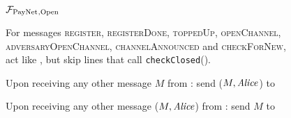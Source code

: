 \begin{figure}[!htbp]
  \begin{systembox}{$\mathcal{F}_{\mathrm{PayNet}}{}_{\mathrm{, Open}}$}
    \begin{algorithmic}[1]
      \State For messages \textsc{register}, \textsc{registerDone},
      \textsc{toppedUp}, \textsc{openChannel},
      \textsc{adversaryOpenChannel}, \textsc{channelAnnounced} and
      \textsc{checkForNew}, act like \fpaynet{}, but skip lines that call
      \texttt{checkClosed}().
      \Statex

      \State Upon receiving any other message $M$ from \alice:
      \Indent
          \State send ($M, \mathit{Alice}$) to \simulator
        \EndIf
      \EndIndent
      \Statex

      \State Upon receiving any other message ($M, \mathit{Alice}$) from \simulator:
      \Indent
          \State send $M$ to \alice
        \EndIf
      \EndIndent
    \end{algorithmic}
  \end{systembox}
  \caption{}
  \label{alg:proof:fpaynet:open}
\end{figure}

